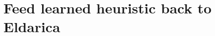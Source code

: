 \documentclass{article}
\begin{document}
%





\section{Feed learned heuristic back to Eldarica}
\end{document}
